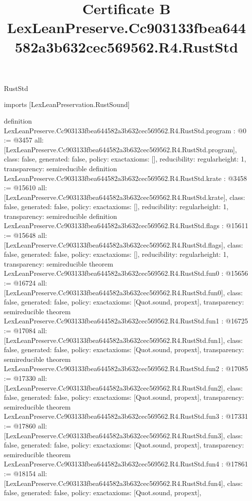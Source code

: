 \begin{lexlean}{RustStd}
\title{Certificate B LexLeanPreserve.Cc903133fbea644582a3b632cec569562.R4.RustStd}
\begin{coremodule}
imports [LexLeanPreservation.RustSound]

definition LexLeanPreserve.Cc903133fbea644582a3b632cec569562.R4.RustStd.program : @0 := @3457 {
  all: [LexLeanPreserve.Cc903133fbea644582a3b632cec569562.R4.RustStd.program],
  class: false,
  generated: false,
  policy: exact{axioms: []},
  reducibility: regular{height: 1},
  transparency: semireducible
}
definition LexLeanPreserve.Cc903133fbea644582a3b632cec569562.R4.RustStd.krate : @3458 := @15610 {
  all: [LexLeanPreserve.Cc903133fbea644582a3b632cec569562.R4.RustStd.krate],
  class: false,
  generated: false,
  policy: exact{axioms: []},
  reducibility: regular{height: 1},
  transparency: semireducible
}
definition LexLeanPreserve.Cc903133fbea644582a3b632cec569562.R4.RustStd.flags : @15611 := @15648 {
  all: [LexLeanPreserve.Cc903133fbea644582a3b632cec569562.R4.RustStd.flags],
  class: false,
  generated: false,
  policy: exact{axioms: []},
  reducibility: regular{height: 1},
  transparency: semireducible
}
theorem LexLeanPreserve.Cc903133fbea644582a3b632cec569562.R4.RustStd.fun0 : @15656 := @16724 {
  all: [LexLeanPreserve.Cc903133fbea644582a3b632cec569562.R4.RustStd.fun0],
  class: false,
  generated: false,
  policy: exact{axioms: [Quot.sound, propext]},
  transparency: semireducible
}
theorem LexLeanPreserve.Cc903133fbea644582a3b632cec569562.R4.RustStd.fun1 : @16725 := @17084 {
  all: [LexLeanPreserve.Cc903133fbea644582a3b632cec569562.R4.RustStd.fun1],
  class: false,
  generated: false,
  policy: exact{axioms: [Quot.sound, propext]},
  transparency: semireducible
}
theorem LexLeanPreserve.Cc903133fbea644582a3b632cec569562.R4.RustStd.fun2 : @17085 := @17330 {
  all: [LexLeanPreserve.Cc903133fbea644582a3b632cec569562.R4.RustStd.fun2],
  class: false,
  generated: false,
  policy: exact{axioms: [Quot.sound, propext]},
  transparency: semireducible
}
theorem LexLeanPreserve.Cc903133fbea644582a3b632cec569562.R4.RustStd.fun3 : @17331 := @17860 {
  all: [LexLeanPreserve.Cc903133fbea644582a3b632cec569562.R4.RustStd.fun3],
  class: false,
  generated: false,
  policy: exact{axioms: [Quot.sound, propext]},
  transparency: semireducible
}
theorem LexLeanPreserve.Cc903133fbea644582a3b632cec569562.R4.RustStd.fun4 : @17861 := @18154 {
  all: [LexLeanPreserve.Cc903133fbea644582a3b632cec569562.R4.RustStd.fun4],
  class: false,
  generated: false,
  policy: exact{axioms: [Quot.sound, propext]},
}
\end{coremodule}
\end{lexlean}
